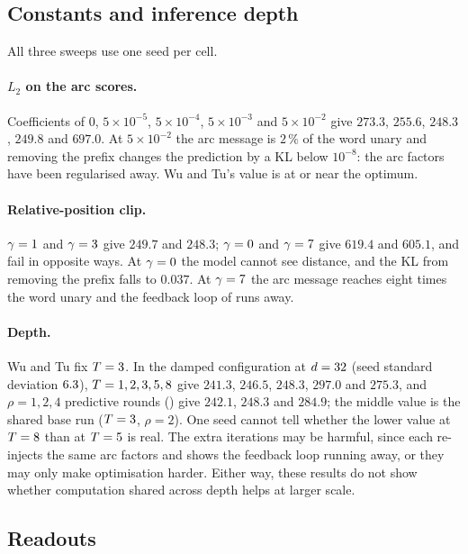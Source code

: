 \subsection{Constants and inference depth}
\label{app:res-knobs}

All three sweeps use one seed per cell.

\paragraph{$L_2$ on the arc scores.}
Coefficients of $0$, $5\times10^{-5}$, $5\times10^{-4}$, $5\times10^{-3}$ and $5\times10^{-2}$
give $273.3$, $255.6$, $248.3$, $249.8$ and $697.0$. At $5\times10^{-2}$ the arc message is
$2\,\%$ of the word unary and removing the prefix changes the prediction by a KL below
$10^{-8}$: the arc factors have been regularised away. Wu and Tu's value is at or near the
optimum.

\paragraph{Relative-position clip.}
$\gamma=1$ and $\gamma=3$ give $249.7$ and $248.3$; $\gamma=0$ and $\gamma=7$ give $619.4$ and
$605.1$, and fail in opposite ways. At $\gamma=0$ the model cannot see distance, and the KL from
removing the prefix falls to $0.037$. At $\gamma=7$ the arc message reaches eight times the word
unary and the feedback loop of  runs away.

\paragraph{Depth.}
Wu and Tu fix $T=3$. In the damped configuration at $d=32$ (seed standard deviation
$6.3$), $T=1,2,3,5,8$ give $241.3$, $246.5$, $248.3$, $297.0$ and $275.3$, and
$\rho=1,2,4$ predictive rounds () give $242.1$, $248.3$ and $284.9$; the
middle value is the shared base run ($T=3$, $\rho=2$). One seed cannot tell whether the
lower value at $T=8$ than at $T=5$ is real. The extra iterations may be harmful, since
each re-injects the same arc factors and  shows the feedback loop running
away, or they may only make optimisation harder. Either way, these results do not show whether
computation shared across depth helps at larger scale.

\subsection{Readouts}
\label{app:res-readout}

